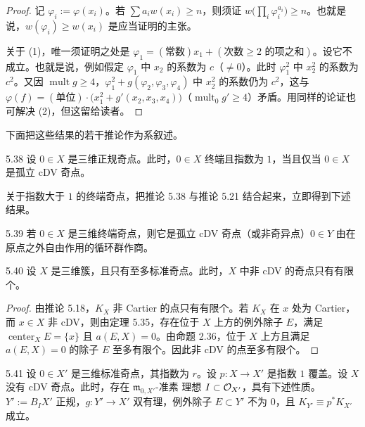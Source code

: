 \begin{proof}
记 $\varphi_i:=\varphi(x_i)$。若 $\sum a_iw(x_i)\ge n$，则须证 $w\bigl(\prod_i\varphi_i^{a_i}\bigr)\ge n$。也就是说，$w(\varphi_i)\ge w(x_i)$ 是应当证明的主张。

关于 (1)，唯一须证明之处是 $\varphi_1=(\text{常数})x_1+(\text{次数}\ge2\text{ 的项之和})$。设它不成立。也就是说，例如假定 $\varphi_1$ 中 $x_2$ 的系数为 $c$（$\ne0$）。此时 $\varphi_1^2$ 中 $x_2^2$ 的系数为 $c^2$。又因 $\operatorname{mult}g\ge4$，$\varphi_1^2+g(\varphi_2,\varphi_3,\varphi_4)$ 中 $x_2^2$ 的系数仍为 $c^2$，这与 $\varphi(f)=(\text{单位})\cdot\bigl(x_1^2+g'(x_2,x_3,x_4)\bigr)$（$\operatorname{mult}_0g'\ge4$）矛盾。用同样的论证也可解决 (2)，但这留给读者。
\end{proof}


下面把这些结果的若干推论作为系叙述。

\begin{corollary}{5.38}
设 $0\in X$ 是三维正规奇点。此时，$0\in X$ 终端且指数为 $1$，当且仅当 $0\in X$ 是孤立 cDV 奇点。
\end{corollary}

关于指数大于 $1$ 的终端奇点，把推论 5.38 与推论 5.21 结合起来，立即得到下述结果。

\begin{corollary}{5.39}
若 $0\in X$ 是三维终端奇点，则它是孤立 cDV 奇点（或非奇异点）$0\in Y$ 由在原点之外自由作用的循环群作商。
\end{corollary}

\begin{corollaryp}{5.40}
设 $X$ 是三维簇，且只有至多标准奇点。此时，$X$ 中非 cDV 的奇点只有有限个。
\end{corollaryp}

\begin{proof}
由推论 5.18，$K_X$ 非 Cartier 的点只有有限个。若 $K_X$ 在 $x$ 处为 Cartier，而 $x\in X$ 非 cDV，则由定理 5.35，存在位于 $X$ 上方的例外除子 $E$，满足 $\operatorname{center}_XE=\{x\}$ 且 $a(E,X)=0$。由命题 2.36，位于 $X$ 上方且满足 $a(E,X)=0$ 的除子 $E$ 至多有限个。因此非 cDV 的点至多有限个。
\end{proof}

\begin{corollaryp}{5.41}
设 $0\in X'$ 是三维标准奇点，其指数为 $r$。设 $p\colon X\to X'$ 是指数 $1$ 覆盖。设 $X$ 没有 cDV 奇点。此时，存在 $\mathfrak{m}_{0,X'}$-准素
理想 $I\subset\mathcal{O}_{X'}$，具有下述性质。$Y':=B_IX'$ 正规，$g\colon Y'\to X'$ 双有理，例外除子 $E\subset Y'$ 不为 $0$，且 $K_{Y'}\equiv p^*K_{X'}$ 成立。
\end{corollaryp}

